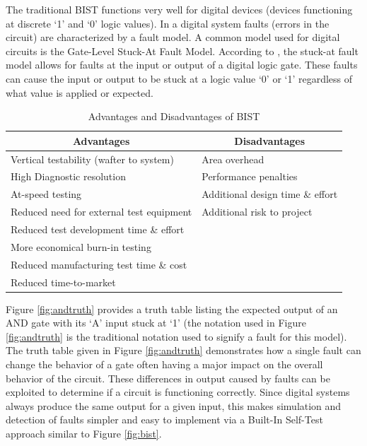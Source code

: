\documentclass[12pt]{report}
\begin{document}
The traditional BIST functions very well for digital devices (devices functioning at discrete `1' and `0' logic values).  In a digital system faults (errors in the circuit) are characterized by a fault model.  A common model used for digital circuits is the Gate-Level Stuck-At Fault Model.  According to \cite{stroud}, the stuck-at fault model allows for faults at the input or output of a digital logic gate.  These faults can cause the input or output to be stuck at a logic value `0' or `1' regardless of what value is applied or expected.  
\begin{table}[b!]
	\begin{center}
	\begin{tabular}{|l|l|}
		\hline
		\multicolumn{1}{|c|}{{\bf Advantages}} & \multicolumn{1}{|c|}{{\bf Disadvantages}} \\ \hline
		Vertical testability (wafter to system) & Area overhead \\ \hline
		High Diagnostic resolution & Performance penalties \\ \hline
		At-speed testing & Additional design time \& effort \\ \hline
		Reduced need for external test equipment & Additional risk to project \\ \hline
		Reduced test development time \& effort & \\ \hline
		More economical burn-in testing & \\ \hline
		Reduced manufacturing test time \& cost & \\ \hline
		Reduced time-to-market & \\ \hline
	\end{tabular}
	\end{center}
	\caption{Advantages and Disadvantages of BIST\cite{stroud}}
	\label{tbl:advantages}
\end{table}
Figure \ref{fig:andtruth} provides a truth table listing the expected output of an AND gate with its `A' input stuck at `1' (the notation used in Figure \ref{fig:andtruth} is the traditional notation used to signify a fault for this model).  The truth table given in Figure \ref{fig:andtruth} demonstrates how a single fault can change the behavior of a gate often having a major impact on the overall behavior of the circuit.  These differences in output caused by faults can be exploited to determine if a circuit is functioning correctly.  Since digital systems always produce the same output for a given input, this makes simulation and detection of faults simpler and easy to implement via a Built-In Self-Test approach similar to Figure \ref{fig:bist}\cite{stroud}.
\end{document}
